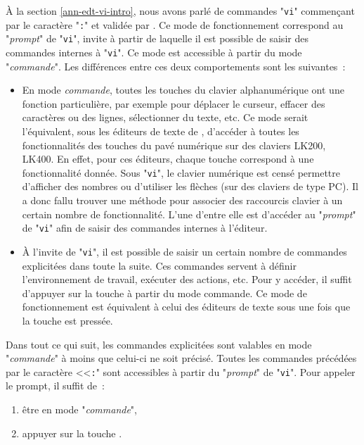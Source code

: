 {\`A} la section \ref{ann-edt-vi-intro}, nous avons parl{\'e} de commandes
"{\tt vi}" commen\c{c}ant par le caract{\`e}re "{\tt :}" et valid{\'e}e par
{\returnkey}. Ce mode de fonctionnement correspond au "{\sl prompt}"
de "{\tt vi}", invite {\`a} partir de laquelle il est possible de saisir
des commandes internes {\`a} "{\tt vi}". Ce mode est accessible {\`a} partir
du mode "{\sl commande}". Les diff{\'e}rences entre ces deux comportements
sont les suivantes~:
\begin{itemize}
	\item	En mode {\sl commande}, toutes les touches du clavier
			alphanum{\'e}rique ont une fonction particuli{\`e}re, par exemple
			pour d{\'e}placer le curseur, effacer des caract{\`e}res ou des lignes,
			s{\'e}lectionner du texte, etc. Ce mode serait l'{\'e}quivalent, sous
			les {\'e}diteurs de texte de {\OpenVMS}, d'acc{\'e}der {\`a} toutes les
			fonction\-nalit{\'e}s des touches du pav{\'e} num{\'e}rique sur des claviers
			LK200, LK400. En effet, pour ces {\'e}diteurs, chaque touche
			correspond {\`a} une fonctionnalit{\'e} donn{\'e}e. Sous "{\tt vi}",
			le clavier num{\'e}rique est cens{\'e} permettre d'afficher des nombres
			ou d'utiliser les fl{\`e}ches (sur des claviers de type PC). Il a
			donc fallu trouver une m{\'e}thode pour associer des raccourcis
			clavier {\`a} un certain nombre de fonctionnalit{\'e}. L'une d'entre
			elle est d'acc{\'e}der au "{\sl prompt}" de "{\tt vi}"
			afin de saisir des commandes internes {\`a} l'{\'e}diteur.\\[2ex]
	\item	{\`A} l'invite de "{\tt vi}", il est possible de saisir
			un certain nombre de commandes explicit{\'e}es dans toute la suite.
			Ces commandes servent {\`a} d{\'e}finir l'environ\-nement de travail,
			ex{\'e}cuter des actions, etc. Pour y acc{\'e}der, il suffit d'appuyer
			sur la touche \key{:} {\`a} partir du mode commande. Ce mode de
			fonctionnement est {\'e}quivalent {\`a} celui des {\'e}diteurs de texte
			sous {\OpenVMS} une fois que la touche  est
			press{\'e}e.
\end{itemize}

Dans tout ce qui suit, les commandes explicit{\'e}es sont valables en
mode "{\sl commande}" {\`a} moins que celui-ci ne soit pr{\'e}cis{\'e}. Toutes
les commandes pr{\'e}c{\'e}d{\'e}es par le caract{\`e}re <<{\tt :}" sont accessibles
{\`a} partir du "{\sl prompt}" de "{\tt vi}". Pour appeler le
prompt, il suffit de~:
\begin{enumerate}
	\item	{\^e}tre en mode "{\sl commande}",
	\item	appuyer sur la touche \key{:}.
\end{enumerate}

